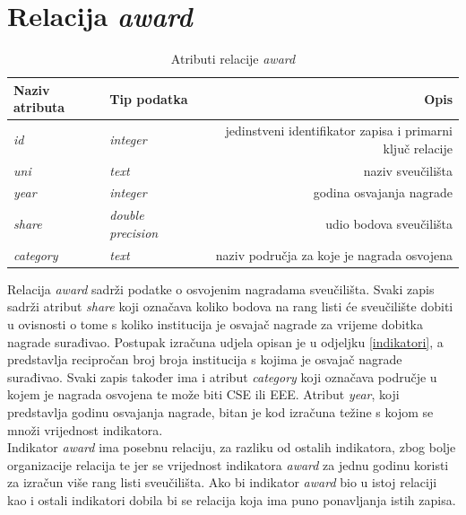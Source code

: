 \documentclass[times, utf8, zavrsni]{fer}
\begin{document}
           \section{Relacija \emph{award}}
           \begin{table}[htb]
               \caption{Atributi relacije \emph{award}}
                   \label{tbl:award}
                   \centering
                   \begin{tabular}{llr} \hline
                   Naziv atributa & Tip podatka & Opis\\ \hline
                   \emph{id} &  \emph{integer} & jedinstveni identifikator zapisa i primarni ključ relacije\\
                   \emph{uni} &  \emph{text} & naziv sveučilišta\\
                   \emph{year} &  \emph{integer} & godina osvajanja nagrade\\
                   \emph{share} &  \emph{double precision} & udio bodova sveučilišta\\
                   \emph{category} &  \emph{text} & naziv područja za koje je nagrada osvojena\\
                   \end{tabular}
                   \end{table}    
                   \FloatBarrier 
           Relacija \emph{award} sadrži podatke o osvojenim nagradama sveučilišta. Svaki zapis sadrži atribut \emph{share} koji označava 
           koliko bodova na rang listi će sveučilište dobiti u ovisnosti o tome s koliko institucija je osvajač nagrade za vrijeme dobitka nagrade
           surađivao. Postupak izračuna udjela opisan je u odjeljku \ref{indikatori}, a predstavlja recipročan broj broja institucija s kojima je osvajač 
           nagrade surađivao. Svaki zapis također ima i atribut \emph{category} koji označava područje u kojem je nagrada osvojena te može biti CSE ili EEE.
           Atribut \emph{year}, koji predstavlja godinu osvajanja nagrade, bitan je kod izračuna težine s kojom se množi vrijednost indikatora.
           \\Indikator \emph{award} ima posebnu relaciju, za razliku od ostalih indikatora, zbog bolje organizacije relacija te jer se 
           vrijednost indikatora \emph{award} za jednu godinu koristi za izračun više rang listi sveučilišta. Ako bi indikator \emph{award} bio u istoj relaciji
           kao i ostali indikatori dobila bi se relacija koja ima puno ponavljanja istih zapisa.
\end{document}
